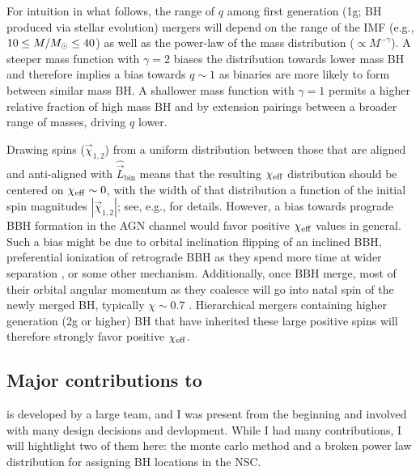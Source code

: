 For intuition in what follows, the range of $q$ among first generation (1g; BH produced via stellar evolution) mergers will depend on the range of the IMF (e.g., $10\leq M/M_{\odot} \leq 40$) as well as the power-law of the mass distribution ($\propto M^{-\gamma}$).
A steeper mass function with $\gamma = 2$ biases the distribution towards lower mass BH and therefore implies a bias towards $q \sim 1$ as binaries are more likely to form between similar mass BH.
A shallower mass function with $\gamma = 1$ permits a higher relative fraction of high mass BH and by extension pairings between a broader range of masses, driving $q$ lower.

Drawing spins ($\vec{\chi}_{1,2}$) from a uniform distribution between those that are aligned and anti-aligned with $\hat{\vec{L}}_\text{bin}$ means that the resulting $\chi_{\rm eff}$ distribution should be centered on $\chi_{\rm eff} \sim 0$, with the width of that distribution a function of the initial spin magnitudes $|\vec{\chi}_{1,2}|$; see, e.g., \cite{Callister21} for details.
However, a bias towards prograde BBH formation in the AGN channel would favor positive $\chi_{\rm eff}$ values in general.
Such a bias might be due to orbital inclination flipping \citep{DittmannDempseyLi24} of an inclined BBH, preferential ionization of retrograde BBH as they spend more time at wider separation \citep[on average,][]{Wang+21,Calcino+23}, or some other mechanism.
Additionally, once BBH merge, most of their orbital angular momentum as they coalesce will go into natal spin of the newly merged BH, typically $\chi \sim 0.7$ \citep{TichyMarronetti08}.
Hierarchical mergers containing higher generation (2g or higher) BH that have inherited these large positive spins will therefore strongly favor positive $\chi_{\rm eff}$.

\subsection{Major contributions to \mcfacts}

\mcfacts is developed by a large team, and I was present from the beginning and involved with many design decisions and devlopment.
While I had many contributions, I will hightlight two of them here: the monte carlo method and a broken power law distribution for assigning BH locations in the NSC.

